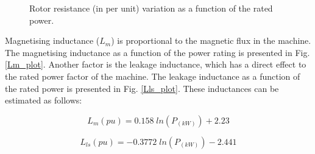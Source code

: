 \documentclass[twocolumn]{article}
\begin{document}
\begin{figure}[]
  \centering

    \caption{Rotor resistance (in per unit) variation as a function of the rated power.} 
    \label{Rs}
\end{figure}

Magnetising inductance ($L_m$) is proportional to the magnetic flux in the machine. The magnetising inductance as a function of the power rating is presented in Fig. \ref{Lm_plot}. Another factor is the leakage inductance, which has a direct effect to the rated power factor of the machine. The leakage inductance as a function of the rated power is presented in Fig. \ref{Lls_plot}. These inductances can be estimated as follows:

\begin{equation}
 	L_m (pu) = 0.158\;ln (P_{(kW)}) + 2.23
 	\label{eq:Lm}
 \end{equation} 

\begin{equation}
 	L_{ls}(pu) = -0.3772 \;ln (P_{(kW)}) - 2.441
 	\label{eq:Lls}
 \end{equation} 
\end{document}
